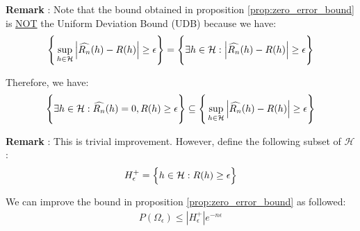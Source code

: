 \noindent \textbf{Remark} : Note that the bound obtained in proposition \ref{prop:zero_error_bound} is \underline{NOT} the Uniform Deviation Bound (UDB) because we have:
\begin{align*}
    \Bigg\{ 
        \sup_{h\in\mathcal{H}} \Big| 
            \widehat{R_n}(h) - R(h)
         \Big|\ge\epsilon
     \Bigg\}
    = 
    \Bigg\{ 
        \exists h \in \mathcal{H} :  \Big| 
            \widehat{R_n}(h) - R(h)
         \Big|\ge\epsilon
     \Bigg\}
\end{align*}

\noindent Therefore, we have:
\begin{align*}
    \Bigg\{ 
        \exists h \in \mathcal{H} : \widehat{R_n}(h) = 0, R(h)\ge\epsilon
     \Bigg\} \subseteq \Bigg\{ 
        \sup_{h\in\mathcal{H}} \Big| 
            \widehat{R_n}(h) - R(h)
         \Big|\ge\epsilon
     \Bigg\}
\end{align*}

\noindent \textbf{Remark} : This is trivial improvement. However, define the following subset of $\mathcal{H}$:
\begin{align*}
    H^+_\epsilon = \Big\{ h \in \mathcal{H} : R(h) \ge \epsilon \Big\}
\end{align*}

\noindent We can improve the bound in proposition \ref{prop:zero_error_bound} as followed:
\begin{align*}
    P(\Omega_\epsilon) \le |H^+_\epsilon|e^{-n\epsilon}
\end{align*}

\newpage


